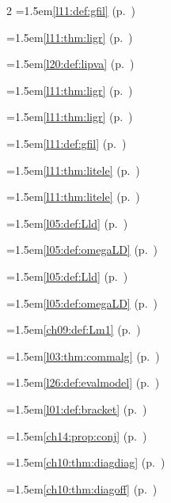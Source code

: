 \begin{multicols}{2}
\hangindent=1.5em\quad \ref{l11:def:gfil} (p.~\pageref{l11:def:gfil})\par
\hangindent=1.5em\quad \ref{l11:thm:ligr} (p.~\pageref{l11:thm:ligr})\par
\hangindent=1.5em\quad \ref{l20:def:lipva} (p.~\pageref{l20:def:lipva})\par
\hangindent=1.5em\quad \ref{l11:thm:ligr} (p.~\pageref{l11:thm:ligr})\par
\hangindent=1.5em\quad \ref{l11:thm:ligr} (p.~\pageref{l11:thm:ligr})\par
\hangindent=1.5em\quad \ref{l11:def:gfil} (p.~\pageref{l11:def:gfil})\par
\hangindent=1.5em\quad \ref{l11:thm:litele} (p.~\pageref{l11:thm:litele})\par
\hangindent=1.5em\quad \ref{l11:thm:litele} (p.~\pageref{l11:thm:litele})\par
\hangindent=1.5em\quad \ref{l05:def:Lld} (p.~\pageref{l05:def:Lld})\par
\hangindent=1.5em\quad \ref{l05:def:omegaLD} (p.~\pageref{l05:def:omegaLD})\par
\hangindent=1.5em\quad \ref{l05:def:Lld} (p.~\pageref{l05:def:Lld})\par
\hangindent=1.5em\quad \ref{l05:def:omegaLD} (p.~\pageref{l05:def:omegaLD})\par
\hangindent=1.5em\quad \ref{ch09:def:Lm1} (p.~\pageref{ch09:def:Lm1})\par
\hangindent=1.5em\quad \ref{l03:thm:commalg} (p.~\pageref{l03:thm:commalg})\par
\hangindent=1.5em\quad \ref{l26:def:evalmodel} (p.~\pageref{l26:def:evalmodel})\par
\hangindent=1.5em\quad \ref{l01:def:bracket} (p.~\pageref{l01:def:bracket})\par
\hangindent=1.5em\quad \ref{ch14:prop:conj} (p.~\pageref{ch14:prop:conj})\par
\hangindent=1.5em\quad \ref{ch10:thm:diagdiag} (p.~\pageref{ch10:thm:diagdiag})\par
\hangindent=1.5em\quad \ref{ch10:thm:diagoff} (p.~\pageref{ch10:thm:diagoff})\par

\end{multicols}
